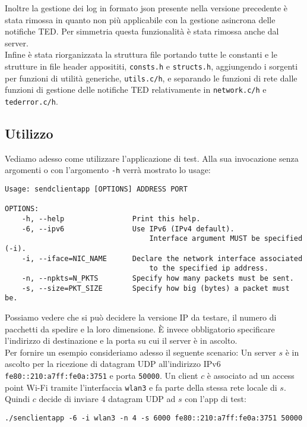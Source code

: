 \documentclass[a4paper,10pt]{article}
\begin{document}
Inoltre la gestione dei log in formato json presente nella versione
precedente è stata rimossa in quanto non più applicabile con la gestione
asincrona delle notifiche TED. Per simmetria questa funzionalità è stata 
rimossa anche dal server.\\

Infine è stata riorganizzata la struttura file portando tutte le
constanti e le strutture in file header apposititi, \texttt{consts.h} e
\texttt{structs.h}, aggiungendo i sorgenti per funzioni di utilità generiche,
\texttt{utils.c/h}, e separando le funzioni di rete dalle funzioni di
gestione delle notifiche TED relativamente in \texttt{network.c/h} e
\texttt{tederror.c/h}.

\subsection{Utilizzo}
Vediamo adesso come utilizzare l'applicazione di test. Alla sua
invocazione senza argomenti o con l'argomento \texttt{-h} verrà mostrato
lo usage:

\begin{lstlisting}
Usage: sendclientapp [OPTIONS] ADDRESS PORT

OPTIONS:
    -h, --help                Print this help.
    -6, --ipv6                Use IPv6 (IPv4 default).
                                  Interface argument MUST be specified (-i).
    -i, --iface=NIC_NAME      Declare the network interface associated
                                  to the specified ip address.
    -n, --npkts=N_PKTS        Specify how many packets must be sent.
    -s, --size=PKT_SIZE       Specify how big (bytes) a packet must be.
\end{lstlisting}

Possiamo vedere che si può decidere la versione IP da testare, il numero
di pacchetti da spedire e la loro dimensione. È invece obbligatorio
specificare l'indirizzo di destinazione e la porta su cui il server è in
ascolto.\\

Per fornire un esempio consideriamo adesso il seguente scenario:
Un server $s$ è in ascolto per la ricezione di datagram UDP
all'indirizzo IPv6 \texttt{fe80::210:a7ff:fe0a:3751} e porta
\texttt{50000}. Un client $c$ è 
associato ad un access point Wi-Fi tramite l'interfaccia \texttt{wlan3} e 
fa parte della stessa rete locale di $s$.
Quindi $c$ decide di inviare 4 datagram UDP ad $s$ con l'app di test:

\begin{lstlisting}
./senclientapp -6 -i wlan3 -n 4 -s 6000 fe80::210:a7ff:fe0a:3751 50000
\end{lstlisting}
\end{document}
